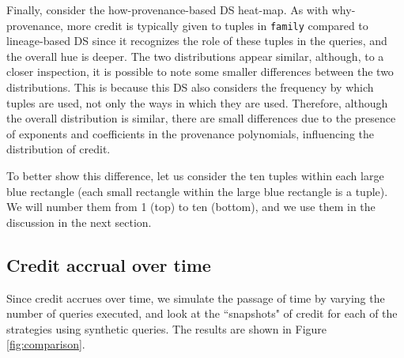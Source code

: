 Finally, consider the how-provenance-based DS heat-map. %
As with why-provenance, more credit is typically given to tuples in \texttt{family} compared to lineage-based DS since it recognizes the role of these tuples in the queries, and the overall hue is deeper.  
The two distributions appear similar, although, to a closer inspection, it is possible to note some smaller differences between the two distributions. 
This is because this DS also considers the frequency by which tuples are used, not only the ways in which they are used. Therefore, although the overall distribution is similar, there are small differences due to the presence of exponents and coefficients in the provenance polynomials, influencing the distribution of credit. 

To better show this difference, let us consider the ten tuples within each large blue rectangle (each small rectangle within the large blue rectangle is a tuple). We will number them from 1 (top) to ten (bottom), and we use them in the discussion in the next section.  



\subsection{Credit accrual over time} 
Since credit accrues over time, we simulate the passage of time by varying the number of queries executed, and look at the ``snapshots" of credit for each of the strategies using synthetic queries.  The results are shown in Figure \ref{fig:comparison}.

